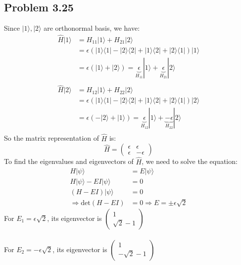 \documentclass{article}
\begin{document}
\subsection*{Problem 3.25}
Since \(|1\rangle, |2\rangle\) are orthonormal basis, we have:
\begin{align*}
	\hat{H} |1\rangle & = H_{11} |1\rangle + H_{21} |2\rangle                                                                                        \\
	                  & = \epsilon (|1 \rangle \langle 1| - |2 \rangle \langle 2| + |1\rangle \langle 2| + |2\rangle \langle 1|) |1\rangle           \\
	                  & = \epsilon (|1 \rangle + |2 \rangle) = \underbrace{\epsilon}_{H_{11}} |1 \rangle + \underbrace{\epsilon}_{H_{21}} |2 \rangle \\
	\\
	\hat{H} |2\rangle & = H_{12} |1\rangle + H_{22} |2\rangle                                                                                        \\
	                  & = \epsilon (|1 \rangle \langle 1| - |2 \rangle \langle 2| + |1\rangle \langle 2| + |2\rangle \langle 1|) |2\rangle           \\
	                  & = \epsilon (-|2\rangle + |1\rangle) = \underbrace{\epsilon}_{H_{12}} |1 \rangle + \underbrace{-\epsilon}_{H_{22}} |2 \rangle \\
\end{align*}
So the matrix representation of \(\hat{H}\) is:
\begin{equation*}
	\hat{H} = \begin{pmatrix}
		\epsilon & \epsilon  \\
		\epsilon & -\epsilon
	\end{pmatrix}
\end{equation*}
To find the eigenvalues and eigenvectors of \(\hat{H}\), we need to solve the equation:
\begin{align*}
	H |\psi\rangle                   & = E |\psi\rangle \\
	H |\psi\rangle - EI |\psi\rangle & = 0              \\
	(H - EI) |\psi\rangle            & = 0              \\
	\Rightarrow \text{det}(H - EI)   & = 0
	\Rightarrow E = \pm \epsilon \sqrt{2}
\end{align*}
For \(E_1 = \epsilon \sqrt{2}\), its eigenvector is
\(\begin{pmatrix}
	1 \\
	\sqrt{2} -1
\end{pmatrix}\) \\ \\
For \(E_2 = -\epsilon \sqrt{2}\), its eigenvector is
\(
\begin{pmatrix}
	1 \\
	-\sqrt{2} -1
\end{pmatrix}
\)
\end{document}
